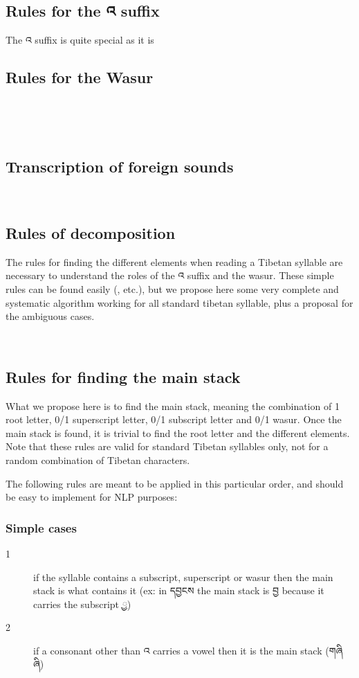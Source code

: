\documentclass[%
a4paper,%
pagesize,%
12pt,%
parskip=off,%
bibliography=totoc,%
numbers=noenddot,%
DIV=12,%
twoside=semi,%
headings=normal%
]{scrartcl}
\begin{document}
­\subsection{Rules for the འ suffix}

The འ suffix is quite special as it is

\subsection{Rules for the Wasur}

­

­\subsection{Transcription of foreign sounds}


­\subsection{Rules of decomposition}

The rules for finding the different elements when reading a Tibetan syllable are necessary to understand the roles of the འ suffix and the wasur. These simple rules can be found easily (\cite{TournadreMST}, etc.), but we propose here some very complete and systematic algorithm working for all standard tibetan syllable, plus a proposal for the ambiguous cases.

­\subsection{Rules for finding the main stack}

What we propose here is to find the main stack, meaning the combination of 1 root letter, 0/1 superscript letter, 0/1 subscript letter and 0/1 wasur. Once the main stack is found, it is trivial to find the root letter and the different elements. Note that these rules are valid for standard Tibetan syllables only, not for a random combination of Tibetan characters.

The following rules are meant to be applied in this particular order, and should be easy to implement for NLP purposes:

\subsubsection*{Simple cases}

\begin{description}
\item[1] if the syllable contains a subscript, superscript or wasur then the main stack is what contains it (ex: in དབྱངས the main stack is བྱ because it carries the subscript ྱ)
\item[2] if a consonant other than འ carries a vowel then it is the main stack (གཞི \rightarrow{} ཞི)
\end{description}
\end{document}
